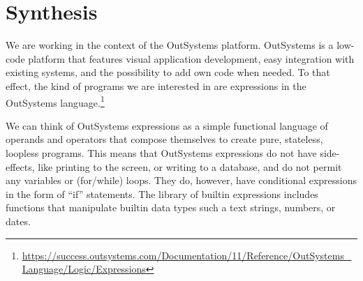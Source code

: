 \section{Synthesis}
\label{sec:synthesis}

We are working in the context of the OutSystems platform. OutSystems is a
low-code platform that features visual application development, easy integration
with existing systems, and the possibility to add own code when needed. To that
effect, the kind of programs we are interested in are expressions in the
OutSystems language.\footnote{\url{https://success.outsystems.com/Documentation/11/Reference/OutSystems_Language/Logic/Expressions}}

We can think of OutSystems expressions as a simple functional language of
operands and operators that compose themselves to create pure, stateless,
loopless programs. This means that OutSystems expressions do not have
side-effects, like printing to the screen, or writing to a database, and do not
permit any variables or (for/while) loops. They do, however, have conditional
expressions in the form of ``if'' statements. The library of builtin expressions
includes functions that manipulate builtin data types such a text strings,
numbers, or dates.

